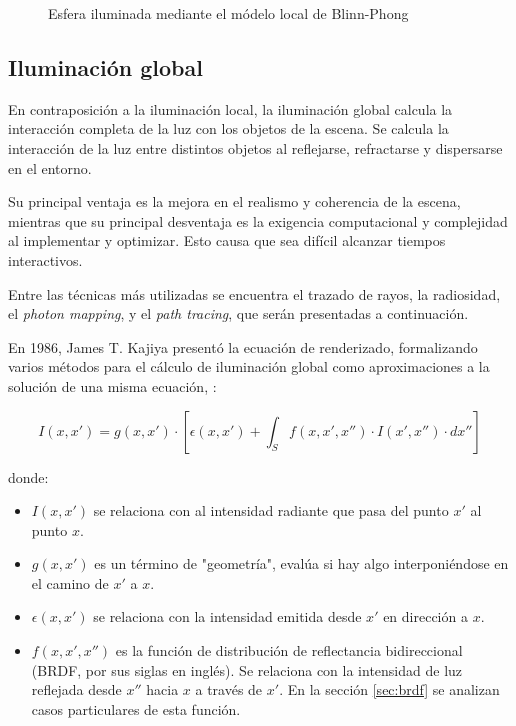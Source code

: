 \begin{figure}
\begin{center}
    \end{center}

    \caption{Esfera iluminada mediante el módelo local de Blinn-Phong}
    \label{fig:sphere-blinn-phong}
\end{figure}

\subsection{Iluminación global}

En contraposición a la iluminación local, la iluminación global calcula la interacción completa de la luz con los objetos de la escena.
Se calcula la interacción de la luz entre distintos objetos al reflejarse, refractarse y dispersarse en el entorno.

Su principal ventaja es la mejora en el realismo y coherencia de la escena, mientras que su principal desventaja es la exigencia computacional y complejidad al implementar y optimizar.
Esto causa que sea difícil alcanzar tiempos interactivos.

Entre las técnicas más utilizadas se encuentra el trazado de rayos, la radiosidad, el \textit{photon mapping}, y el \textit{path tracing}, que serán presentadas a continuación.

En 1986, James T. Kajiya presentó la ecuación de renderizado, formalizando varios métodos para el cálculo de iluminación global como aproximaciones a la solución de una misma ecuación, \cite{rendering-equation}:

\begin{equation}\label{eq:rendering_equation}
    I(x, x') = g(x, x') \cdot \left[\epsilon(x, x') + \int_S f(x, x', x'') \cdot I(x', x'') \cdot dx'' \right]
\end{equation}

donde:
\begin{itemize}
    \item $I(x, x')$ se relaciona con al intensidad radiante que pasa del punto $x'$ al punto $x$.
    \item $g(x, x')$ es un término de "geometría", evalúa si hay algo interponiéndose en el camino de $x'$ a $x$.
    \item $\epsilon(x, x')$ se relaciona con la intensidad emitida desde $x'$ en dirección a $x$.
    \item $f(x, x', x'')$ es la función de distribución de reflectancia bidireccional (BRDF, por sus siglas en inglés). Se relaciona con la intensidad de luz reflejada desde $x''$ hacia $x$ a través de $x'$. En la sección \ref{sec:brdf} se analizan casos particulares de esta función.
\end{itemize}

